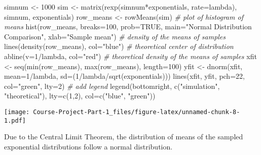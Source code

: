 \documentclass[
]{article}
\newenvironment{Shaded}{\begin{snugshade}}{\end{snugshade}}
\newcommand{\AttributeTok}[1]{\textcolor[rgb]{0.77,0.63,0.00}{#1}}
\newcommand{\CommentTok}[1]{\textcolor[rgb]{0.56,0.35,0.01}{\textit{#1}}}
\newcommand{\ConstantTok}[1]{\textcolor[rgb]{0.00,0.00,0.00}{#1}}
\newcommand{\DecValTok}[1]{\textcolor[rgb]{0.00,0.00,0.81}{#1}}
\newcommand{\FunctionTok}[1]{\textcolor[rgb]{0.00,0.00,0.00}{#1}}
\newcommand{\NormalTok}[1]{#1}
\newcommand{\OtherTok}[1]{\textcolor[rgb]{0.56,0.35,0.01}{#1}}
\newcommand{\SpecialCharTok}[1]{\textcolor[rgb]{0.00,0.00,0.00}{#1}}
\newcommand{\StringTok}[1]{\textcolor[rgb]{0.31,0.60,0.02}{#1}}
\begin{document}
\begin{Shaded}
\begin{Highlighting}[]
\NormalTok{simnum }\OtherTok{\textless{}{-}} \DecValTok{1000}
\NormalTok{sim }\OtherTok{\textless{}{-}} \FunctionTok{matrix}\NormalTok{(}\FunctionTok{rexp}\NormalTok{(simnum}\SpecialCharTok{*}\NormalTok{exponentials, }\AttributeTok{rate=}\NormalTok{lambda), simnum, exponentials)}
\NormalTok{row\_means }\OtherTok{\textless{}{-}} \FunctionTok{rowMeans}\NormalTok{(sim)}
\CommentTok{\# plot of histogram of means}
\FunctionTok{hist}\NormalTok{(row\_means, }\AttributeTok{breaks=}\DecValTok{100}\NormalTok{, }\AttributeTok{prob=}\ConstantTok{TRUE}\NormalTok{,}
     \AttributeTok{main=}\StringTok{"Normal Distribution Comparison"}\NormalTok{, }\AttributeTok{xlab=}\StringTok{"Sample mean"}\NormalTok{)}
\CommentTok{\# density of the means of samples}
\FunctionTok{lines}\NormalTok{(}\FunctionTok{density}\NormalTok{(row\_means), }\AttributeTok{col=}\StringTok{"blue"}\NormalTok{)}
\CommentTok{\# theoretical center of distribution}
\FunctionTok{abline}\NormalTok{(}\AttributeTok{v=}\DecValTok{1}\SpecialCharTok{/}\NormalTok{lambda, }\AttributeTok{col=}\StringTok{"red"}\NormalTok{)}
\CommentTok{\# theoretical density of the means of samples}
\NormalTok{xfit }\OtherTok{\textless{}{-}} \FunctionTok{seq}\NormalTok{(}\FunctionTok{min}\NormalTok{(row\_means), }\FunctionTok{max}\NormalTok{(row\_means), }\AttributeTok{length=}\DecValTok{100}\NormalTok{)}
\NormalTok{yfit }\OtherTok{\textless{}{-}} \FunctionTok{dnorm}\NormalTok{(xfit, }\AttributeTok{mean=}\DecValTok{1}\SpecialCharTok{/}\NormalTok{lambda, }\AttributeTok{sd=}\NormalTok{(}\DecValTok{1}\SpecialCharTok{/}\NormalTok{lambda}\SpecialCharTok{/}\FunctionTok{sqrt}\NormalTok{(exponentials)))}
\FunctionTok{lines}\NormalTok{(xfit, yfit, }\AttributeTok{pch=}\DecValTok{22}\NormalTok{, }\AttributeTok{col=}\StringTok{"green"}\NormalTok{, }\AttributeTok{lty=}\DecValTok{2}\NormalTok{)}
\CommentTok{\# add legend}
\FunctionTok{legend}\NormalTok{(}\StringTok{\textquotesingle{}bottomright\textquotesingle{}}\NormalTok{, }\FunctionTok{c}\NormalTok{(}\StringTok{"simulation"}\NormalTok{, }\StringTok{"theoretical"}\NormalTok{), }\AttributeTok{lty=}\FunctionTok{c}\NormalTok{(}\DecValTok{1}\NormalTok{,}\DecValTok{2}\NormalTok{), }\AttributeTok{col=}\FunctionTok{c}\NormalTok{(}\StringTok{"blue"}\NormalTok{, }\StringTok{"green"}\NormalTok{))}
\end{Highlighting}
\end{Shaded}

\texttt{[image: Course-Project-Part-1\_files/figure-latex/unnamed-chunk-8-1.pdf]}

Due to the Central Limit Theorem, the distribution of means of the
sampled exponential distributions follow a normal distribution.
\end{document}
